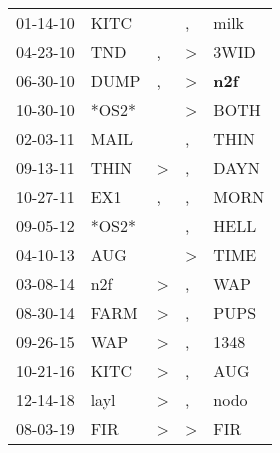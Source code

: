 \begin{supertabular}{p{0.07\textwidth}p{0.06\textwidth}p{0.02\textwidth}p{0.02\textwidth}p{0.06\textwidth}}
 01-14-10\textsuperscript{} &           KITC\textsuperscript{} &               &             , &           milk\textsuperscript{} \\
 04-23-10\textsuperscript{} &            TND\textsuperscript{} &             , &  \textgreater &           3WID\textsuperscript{} \\
 06-30-10\textsuperscript{} &           DUMP\textsuperscript{} &             , &  \textgreater &   \textbf{n2f\textsuperscript{}} \\
 10-30-10\textsuperscript{} &                            *OS2* &               &  \textgreater &           BOTH\textsuperscript{} \\
 02-03-11\textsuperscript{} &           MAIL\textsuperscript{} &               &             , &           THIN\textsuperscript{} \\
 09-13-11\textsuperscript{} &           THIN\textsuperscript{} &  \textgreater &             , &           DAYN\textsuperscript{} \\
 10-27-11\textsuperscript{} &            EX1\textsuperscript{} &             , &             , &           MORN\textsuperscript{} \\
 09-05-12\textsuperscript{} &                            *OS2* &               &             , &           HELL\textsuperscript{} \\
 04-10-13\textsuperscript{} &            AUG\textsuperscript{} &               &  \textgreater &           TIME\textsuperscript{} \\
 03-08-14\textsuperscript{} &            n2f\textsuperscript{} &  \textgreater &             , &            WAP\textsuperscript{} \\
 08-30-14\textsuperscript{} &           FARM\textsuperscript{} &  \textgreater &             , &           PUPS\textsuperscript{} \\
 09-26-15\textsuperscript{} &            WAP\textsuperscript{} &  \textgreater &             , &           1348\textsuperscript{} \\
 10-21-16\textsuperscript{} &           KITC\textsuperscript{} &  \textgreater &             , &            AUG\textsuperscript{} \\
 12-14-18\textsuperscript{} &           layl\textsuperscript{} &  \textgreater &             , &           nodo\textsuperscript{} \\
 08-03-19\textsuperscript{} &            FIR\textsuperscript{} &  \textgreater &  \textgreater &            FIR\textsuperscript{} \\
\end{supertabular}
